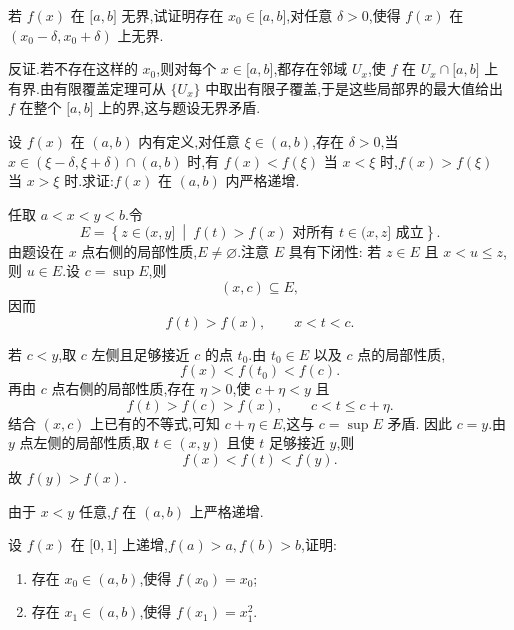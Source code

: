 \begin{example}
    若 $f(x)$ 在 $\lbrack a,b\rbrack$ 无界,试证明存在 $x_0\in\lbrack a,b\rbrack$,对任意 $\delta>0$,使得 $f(x)$ 在 $(x_0-\delta,x_0+\delta)$ 上无界.
\end{example}
\exampleblank

\begin{solution}
    反证.若不存在这样的 $x_0$,则对每个 $x\in\lbrack a,b\rbrack$,都存在邻域 $U_x$,使 $f$ 在 $U_x\cap\lbrack a,b\rbrack$ 上有界.由有限覆盖定理可从 $\{U_x\}$ 中取出有限子覆盖,于是这些局部界的最大值给出 $f$ 在整个 $\lbrack a,b\rbrack$ 上的界,这与题设无界矛盾.
\end{solution}

\begin{example}
    设 $f(x)$ 在 $(a,b)$ 内有定义,对任意 $\xi\in(a,b)$,存在 $\delta>0$,当 $x\in(\xi-\delta,\xi+\delta)\cap(a,b)$ 时,有 $f(x)<f(\xi)$ 当 $x<\xi$ 时,$f(x)>f(\xi)$ 当 $x>\xi$ 时.求证:$f(x)$ 在 $(a,b)$ 内严格递增.
\end{example}
\exampleblank

\begin{solution}
    任取 $a<x<y<b$.令
    \[
        E=\left\{z\in(x,y]\ \middle|\
        f(t)>f(x)\text{ 对所有 }t\in(x,z]\text{ 成立}\right\}.
    \]
    由题设在 $x$ 点右侧的局部性质,$E\neq\varnothing$.注意 $E$ 具有下闭性:
    若 $z\in E$ 且 $x<u\leq z$,则 $u\in E$.设 $c=\sup E$,则
    \[
        (x,c)\subseteq E,
    \]
    因而
    \[
        f(t)>f(x),
        \qquad x<t<c.
    \]

    若 $c<y$,取 $c$ 左侧且足够接近 $c$ 的点 $t_0$.由 $t_0\in E$ 以及 $c$ 点的局部性质,
    \[
        f(x)<f(t_0)<f(c).
    \]
    再由 $c$ 点右侧的局部性质,存在 $\eta>0$,使 $c+\eta<y$ 且
    \[
        f(t)>f(c)>f(x),
        \qquad c<t\leq c+\eta.
    \]
    结合 $(x,c)$ 上已有的不等式,可知 $c+\eta\in E$,这与 $c=\sup E$ 矛盾.
    因此 $c=y$.由 $y$ 点左侧的局部性质,取 $t\in(x,y)$ 且使 $t$ 足够接近 $y$,则
    \[
        f(x)<f(t)<f(y).
    \]
    故 $f(y)>f(x)$.

    由于 $x<y$ 任意,$f$ 在 $(a,b)$ 上严格递增.
\end{solution}

\begin{example}
    设 $f(x)$ 在 $\lbrack 0,1\rbrack$ 上递增,$f(a)>a,f(b)>b$,证明:
    \begin{enumerate}
        \item 存在 $x_0\in(a,b)$,使得 $f(x_0)=x_0$;
        \item 存在 $x_1\in(a,b)$,使得 $f(x_1)=x_1^2$.
    \end{enumerate}
\end{example}
\exampleblank

